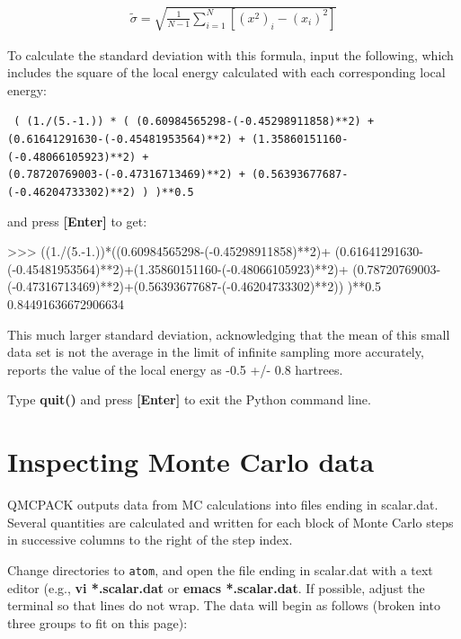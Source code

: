 \begin{align}
  \tilde{\sigma} = \sqrt{\frac{1}{N-1}\sum_{i=1}^{N} \left[{(x^2)}_i - ({x_i})^2\right]}
\end{align}

To calculate the standard deviation with this formula, input the following,
which includes the square of the local energy calculated with each
corresponding local energy:

\texttt{
( (1./(5.-1.)) * ( 
(0.60984565298-(-0.45298911858)**2) + \\
(0.61641291630-(-0.45481953564)**2) + 
(1.35860151160-(-0.48066105923)**2) + \\
(0.78720769003-(-0.47316713469)**2) + 
(0.56393677687-(-0.46204733302)**2) ) 
)**0.5
}

and press \textbf{[Enter]} to get:

\begin{shade}
>>> ((1./(5.-1.))*((0.60984565298-(-0.45298911858)**2)+ 
(0.61641291630-(-0.45481953564)**2)+(1.35860151160-(-0.48066105923)**2)+ 
(0.78720769003-(-0.47316713469)**2)+(0.56393677687-(-0.46204733302)**2))
)**0.5
0.84491636672906634
\end{shade}

This much larger standard deviation, acknowledging that the mean of this small
data set is not the average in the limit of infinite sampling more accurately,
reports the value of the local energy as -0.5 +/- 0.8 hartrees.

Type \textbf{quit()} and press \textbf{[Enter]} to exit the Python command line.

\section{Inspecting Monte Carlo data}
\label{sec:inspect_data} 

QMCPACK outputs data from MC calculations into files ending in scalar.dat.
Several quantities are calculated and written for each block of Monte Carlo
steps in successive columns to the right of the step index. 

Change directories to \texttt{atom}, and open the file ending in
scalar.dat with a text editor (e.g., \textbf{vi *.scalar.dat} or \textbf{emacs
*.scalar.dat}.  If possible, adjust the terminal so that lines do not wrap.
The data will begin as follows (broken into three groups to fit on this page):

